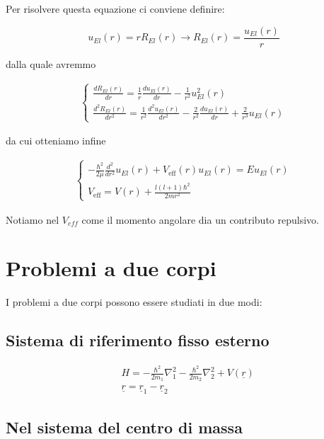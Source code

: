 \newpage
Per risolvere questa equazione ci conviene definire:

\begin{equation}
u_{E l}(r)= r R_{E l}(r) \rightarrow R_{E l}(r)= \frac{u_{E l}(r)}{r}
\end{equation}

dalla quale avremmo

\begin{align}
\left\{
\begin{array}{cc}
\frac{d R_{E l}(r)}{dr} = \frac{1}{r}\frac{d u_{E l}(r)}{d r} - \frac{1}{r^2}u^2_{El}(r)  \qquad \qquad \quad \: \\
\frac{d^2 R_{E l}(r)}{dr^2} = \frac{1}{r^2}\frac{d^2 u_{E l}(r)}{dr^2} - \frac{2}{r^2}\frac{d u_{E l}(r)}{dr} + \frac{2}{r^3} u_{E l}(r)
\end{array}
\right.
\end{align}

da cui otteniamo infine

\begin{align}
\left\{
\begin{array}{cc}
-\frac{\hbar^2}{2 \mu} \frac{d^2 }{dr^2} u_{E l}(r) + V_{\text{eff}}(r)u_{E l}(r) = E u_{E l}(r) \\
V_{\text{eff}}= V(r) +  \frac{l(l+1)\hbar^2}{2m r^2} \qquad\qquad\qquad
\end{array}
\right.
\end{align}

Notiamo nel $V_{eff}$ come il momento angolare dia un contributo repulsivo.

\section{Problemi a due corpi}
I problemi a due corpi possono essere studiati in due modi:

\subsection{Sistema di riferimento fisso esterno} 
	\begin{align}
	{}&H= -\frac{\hbar^2}{2 m_1}\nabla_1^2 -\frac{\hbar^2}{2 m_2}\nabla_2^2 + V(\underline{r}) \\ 
	&\underline{r}= \underline{r}_1 - \underline{r}_2
	\end{align}

\subsection{Nel sistema del centro di massa}
	
